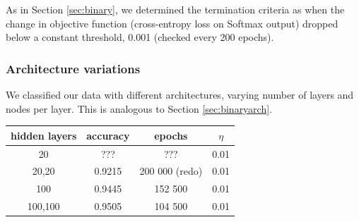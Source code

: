 \documentclass{article}
\begin{document}
\begin{multicols}{2}
As in Section \ref{sec:binary}, we determined the termination criteria as
when the change in objective function (cross-entropy loss on Softmax output)
dropped below a constant threshold, 0.001 (checked every 200 epochs).

\subsubsection{Architecture variations}

We classified our data with different architectures, varying number of layers
and nodes per layer. This is analogous to Section \ref{sec:binaryarch}.


\begin{center}
\begin{tabular}{c|c|c|c}
hidden layers & accuracy	& epochs & $\eta$ \\\hline
        20		& ??? 	& ??? 		& 0.01\\
        20,20	& 0.9215 	& 200 000 (redo) 	& 0.01\\
        100		& 0.9445 	& 152 500 	& 0.01 \\
        100,100	& 0.9505 	& 104 500 	& 0.01
\end{tabular}
\end{center}












\end{multicols}
\end{document}
